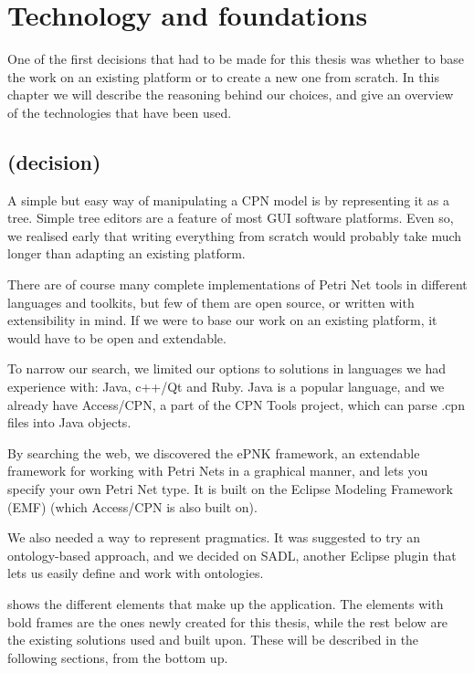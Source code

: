 \chapter{Technology and foundations}
\label{chap:technology}

One of the first decisions that had to be made for this thesis was whether to
base the work on an existing platform or to create a new one from
scratch. In this chapter we will describe the reasoning behind our choices, and
give an overview of the technologies that have been used.

\section{(decision)}
	A simple but easy way of manipulating a CPN model is by representing it as a
	tree. Simple tree editors are a feature of most GUI software platforms. Even
	so, we realised early that writing everything from scratch would probably take
	much longer than adapting an existing platform.

	There are of course many complete implementations of Petri Net tools in
	different languages and toolkits, but few of them are open source, or written with
	extensibility in mind. If we were to base our work on an existing platform, it
	would have to be open and extendable. 
	
	To narrow our search, we limited our options to solutions in
	languages we had experience with: Java, c++/Qt and Ruby. Java is a popular
	language, and we already have Access/CPN, a part of the CPN Tools project,
	which can parse .cpn files into Java objects. 
	
	By searching the web, we discovered the ePNK framework, an extendable framework
	for working with Petri Nets in a graphical manner, and lets you specify your
	own Petri Net type. It is built on the Eclipse Modeling Framework (EMF) (which
	Access/CPN is also built on).
	
	We also needed a way to represent pragmatics. It was suggested to try an
	ontology-based approach, and we decided on SADL, another Eclipse plugin that
	lets us easily define and work with ontologies.
	
	
	 shows the different elements that make up the application.
	The elements with bold frames are the ones newly created for this thesis, while
	the rest below are the existing solutions used and built upon. These will be
	described in the following sections, from the bottom up.

